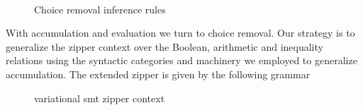 ~\label{section:vsmt:choice-removal}
%
\begin{figure}
  
  \caption{Choice removal inference rules}%
  \label{fig:vsmt:inf:chc}
\end{figure}
%
With accumulation and evaluation we turn to choice removal. Our strategy is to
generalize the zipper context over the Boolean, arithmetic and inequality
relations using the syntactic categories and machinery we employed to generalize
accumulation. The extended zipper is given by the following grammar
% 
\begin{figure}
  
  \caption{variational \ac{smt} zipper context}
  \label{fig:vsmt:zipper}
\end{figure}

% 


